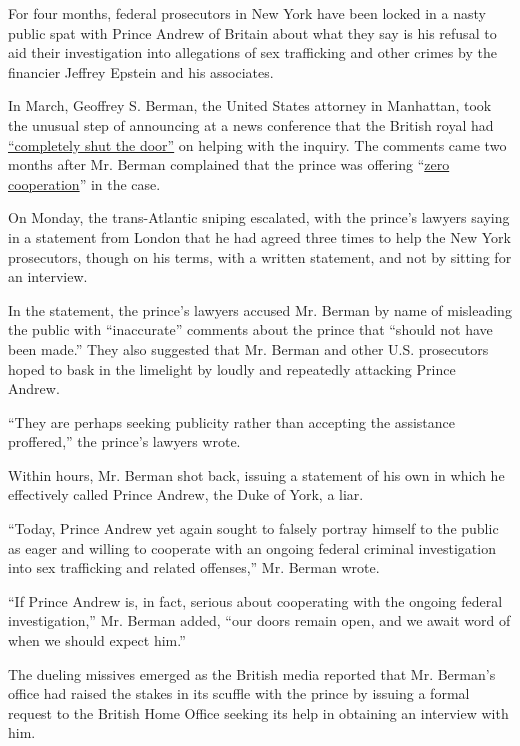 For four months, federal prosecutors in New York have been locked in a
nasty public spat with Prince Andrew of Britain about what they say is
his refusal to aid their investigation into allegations of sex
trafficking and other crimes by the financier Jeffrey Epstein and his
associates.

In March, Geoffrey S. Berman, the United States attorney in Manhattan,
took the unusual step of announcing at a news conference that the
British royal had
\href{https://www.nytimes.com/2020/03/09/nyregion/jeffrey-epstein-prince-andrew.html}{``completely
shut the door''} on helping with the inquiry. The comments came two
months after Mr. Berman complained that the prince was offering
``\href{https://www.nytimes.com/2020/01/27/nyregion/jeffrey-epstein-prince-andrew.html}{zero
cooperation}'' in the case.

On Monday, the trans-Atlantic sniping escalated, with the prince's
lawyers saying in a statement from London that he had agreed three times
to help the New York prosecutors, though on his terms, with a written
statement, and not by sitting for an interview.

In the statement, the prince's lawyers accused Mr. Berman by name of
misleading the public with ``inaccurate'' comments about the prince that
``should not have been made.'' They also suggested that Mr. Berman and
other U.S. prosecutors hoped to bask in the limelight by loudly and
repeatedly attacking Prince Andrew.

``They are perhaps seeking publicity rather than accepting the
assistance proffered,'' the prince's lawyers wrote.

Within hours, Mr. Berman shot back, issuing a statement of his own in
which he effectively called Prince Andrew, the Duke of York, a liar.

``Today, Prince Andrew yet again sought to falsely portray himself to
the public as eager and willing to cooperate with an ongoing federal
criminal investigation into sex trafficking and related offenses,'' Mr.
Berman wrote.

``If Prince Andrew is, in fact, serious about cooperating with the
ongoing federal investigation,'' Mr. Berman added, ``our doors remain
open, and we await word of when we should expect him.''

The dueling missives emerged as the British media reported that Mr.
Berman's office had raised the stakes in its scuffle with the prince by
issuing a formal request to the British Home Office seeking its help in
obtaining an interview with him.

